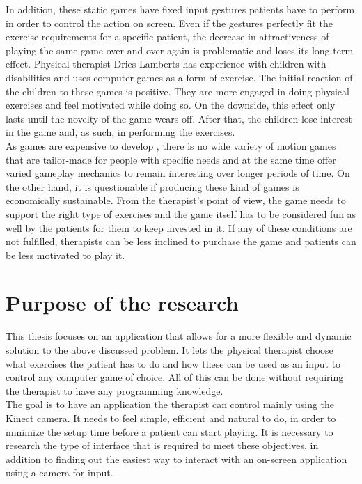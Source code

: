 In addition, these static games have fixed input gestures patients have to perform in order to control the action on screen. Even if the gestures perfectly fit the exercise requirements for a specific patient, the decrease in attractiveness of playing the same game over and over again is problematic and loses its long-term effect. Physical therapist Dries Lamberts has experience with children with disabilities and uses computer games as a form of exercise. The initial reaction of the children to these games is positive. They are more engaged in doing physical exercises and feel motivated while doing so. On the downside, this effect only lasts until the novelty of the game wears off. After that, the children lose interest in the game and, as such, in performing the exercises.\\

As games are expensive to develop \cite{Nakevska2011}, there is no wide variety of motion games that are tailor-made for people with specific needs and at the same time offer varied gameplay mechanics to remain interesting over longer periods of time. On the other hand, it is questionable if producing these kind of games is economically sustainable. From the therapist's point of view, the game needs to support the right type of exercises and the game itself has to be considered fun as well by the patients for them to keep invested in it. If any of these conditions are not fulfilled, therapists can be less inclined to purchase the game and patients can be less motivated to play it.\\


\section{Purpose of the research}

This thesis focuses on an application that allows for a more flexible and dynamic solution to the above discussed problem. It lets the physical therapist choose what exercises the patient has to do and how these can be used as an input to control any computer game of choice. All of this can be done without requiring the therapist to have any programming knowledge.\\

The goal is to have an application the therapist can control mainly using the Kinect camera. It needs to feel simple, efficient and natural to do, in order to minimize the setup time before a patient can start playing. It is necessary to research the type of interface that is required to meet these objectives, in addition to finding out the easiest way to interact with an on-screen application using a camera for input.